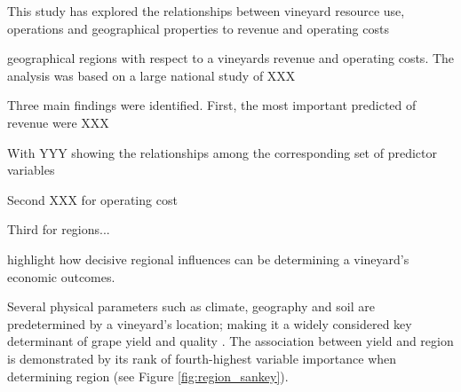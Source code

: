 \documentclass[review,12pt,authoryear]{elsarticle}
\begin{document}
\begin{linenumbers}
This study has explored the relationships between vineyard resource use, operations and geographical properties to revenue and operating costs

geographical regions with respect to a vineyards revenue and operating costs. The analysis was based on a large national study of XXX

Three main findings were identified. First, the most important predicted of revenue were XXX

With YYY showing the relationships among the corresponding set of predictor variables

Second XXX for operating cost

Third for regions...

highlight how decisive regional influences can be determining a vineyard's economic outcomes. 
\par
Several physical parameters such as climate, geography and soil are predetermined by a vineyard's location; making it a widely considered key determinant of grape yield and quality \citep{abbalDecisionSupportSystem2016,agostaRegionalClimateVariability2012,fragaMultivariateClusteringViticultural2017}.
The association between yield and region is demonstrated by its rank of fourth-highest variable importance when determining region (see Figure \ref{fig:region_sankey}).
\par

\end{linenumbers}
\end{document}
